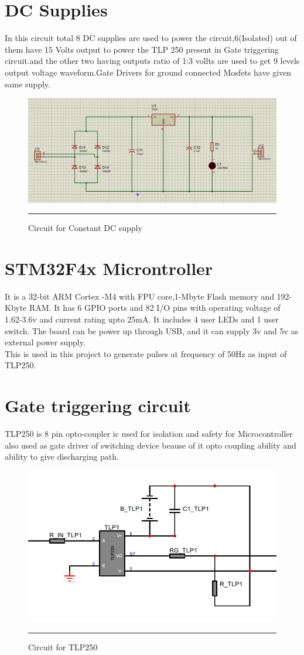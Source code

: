\section{DC Supplies}
In this circuit total 8 DC supplies are used to power the circuit,6(Isolated) out of them have 15 Volts output to power the TLP 250 present in Gate triggering circuit.and the other two having outputs ratio of 1:3 vollts are used to get 9 levels output voltage waveform.Gate Drivers for ground connected Mosfets have given same supply.
\begin{figure}[htbp]
	\centering
		\includegraphics[width = 5in]{./Figures/ss.pdf}
		\rule{35em}{5pt}
	\caption{Circuit for Constant DC supply}
	\label{fig:2}
\end{figure}
\section{STM32F4x Microntroller}
It is a 32-bit ARM Cortex -M4 with FPU core,1-Mbyte Flash memory and 192-Kbyte RAM.
It has 6 GPIO ports and 82 I/O pins with operating voltage of 1.62-3.6v and current
rating upto 25mA. It includes 4 user LEDs and 1 user switch. The board can be power
up through USB, and it can supply 3v and 5v as external power supply.\\
This is used in this project to generate pulses at frequency of 50Hz as input of TLP250.
\section{Gate triggering circuit}	
TLP250 is 8 pin opto-coupler ic used for isolation and safety for Microcontroller also used as gate driver of switching device beause of it opto coupling ability and ability to give discharging path.
\begin{figure}[htbp]
	\centering
		\includegraphics[width = 5in]{./Figures/Gate_driver.JPG}
		\rule{35em}{1pt}
	\caption{Circuit for TLP250}
	\label{fig:3}
\end{figure}

